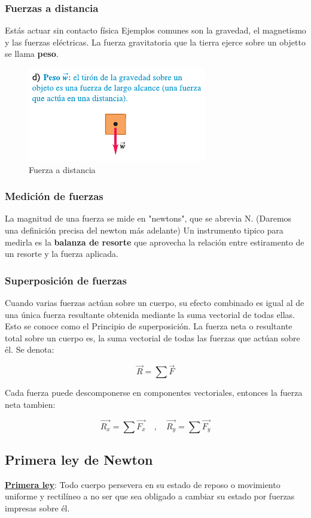 \documentclass{article}
\newcommand{\newsubsection}[1]{
    \vspace{0.5cm}
    \color{sectionColor}
    \subsection{ #1}
    \color{black}
    \vspace{0.5cm}
}
\newcommand{\newtitle}[1]{
    \color{titleColor}
    \subsubsection{\textbf{#1}}
    \color{black}
}
\newcommand{\bl}[1]{\textbf{#1}}
\newcommand{\definicion}[1]{%
    \vspace{0.5cm}
    \begin{definicionbox}
        #1
    \end{definicionbox}
    \vspace{0.5cm}
}
\begin{document}
    \newtitle{Fuerzas a distancia}
        \par Estás actuar sin contacto física Ejemplos comunes son la gravedad, el magnetismo y las fuerzas eléctricas. La fuerza gravitatoria que la tierra ejerce sobre un objetto se llama \bl{peso}.
        \begin{figure}[H]
            \centering
            \includegraphics[scale=0.8]{img/2.1-4.png}
            \caption{Fuerza a distancia}
            \label{fig:Fuerza a distancia}
        \end{figure}

    \newtitle{Medición de fuerzas}

        \par La magnitud de una fuerza se mide en "newtons", que se abrevia N. (Daremos una definición precisa del newton más adelante) Un instrumento tipico para medirla es la \bl{balanza de resorte} que aprovecha la relación entre estiramento de un resorte y la fuerza aplicada.

    \newtitle{Superposición de fuerzas}

        \par Cuando varias fuerzas actúan sobre un cuerpo, su efecto combinado es igual al de una única fuerza resultante obtenida mediante la suma vectorial de todas ellas. Esto se conoce como el Principio de superposición. La fuerza neta o resultante total sobre un cuerpo es, la suma vectorial de todas las fuerzas que actúan sobre él. Se denota:
        
        \[\vec{R} = \sum \vec{F}\]

        \par Cada fuerza puede descomponerse en componentes vectoriales, entonces la fuerza neta tambien:

        \[\vec{R_x} = \sum \vec{F_x} \quad , \quad \vec{R_y} = \sum \vec{F_y}\]

    \newsubsection{Primera ley de Newton}

    \definicion{
        \par \color{blue}\underline{\bl{Primera ley}}\color{black}: Todo cuerpo persevera en su estado de reposo o movimiento uniforme y rectilíneo a no ser que sea obligado a cambiar su estado por fuerzas impresas sobre él. 
    }
\end{document}
